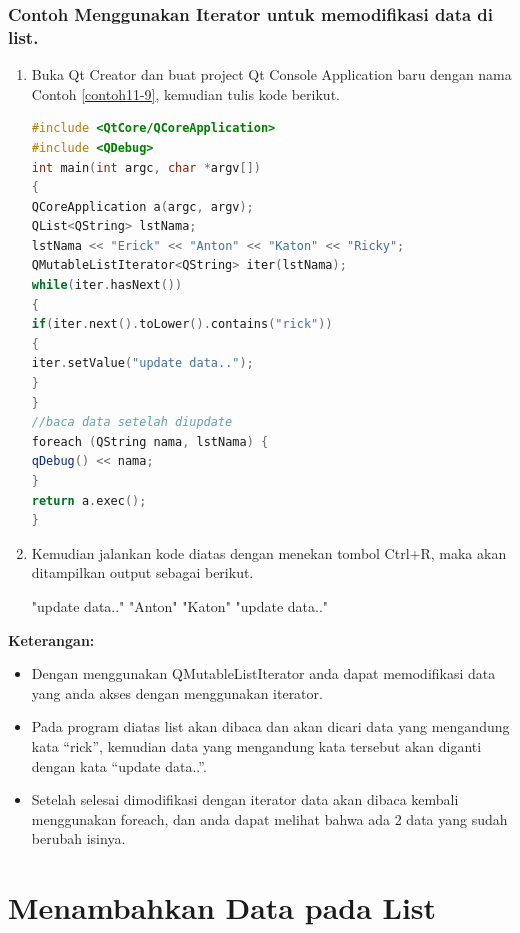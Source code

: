 \subsubsection*{Contoh  Menggunakan Iterator untuk memodifikasi data di list.}

\begin{enumerate}

\item
  Buka Qt Creator dan buat project Qt Console Application baru dengan
  nama Contoh \ref{contoh11-9}, kemudian tulis kode berikut.

\begin{lstlisting}[language=c++, caption= Menggunakan Iterator untuk memodifikasi data di list, label=contoh11-9]
#include <QtCore/QCoreApplication>
#include <QDebug>
int main(int argc, char *argv[])
{
QCoreApplication a(argc, argv);
QList<QString> lstNama;
lstNama << "Erick" << "Anton" << "Katon" << "Ricky";
QMutableListIterator<QString> iter(lstNama);
while(iter.hasNext())
{
if(iter.next().toLower().contains("rick"))
{
iter.setValue("update data..");
}
}
//baca data setelah diupdate
foreach (QString nama, lstNama) {
qDebug() << nama;
}
return a.exec();
}
\end{lstlisting}
\item
  Kemudian jalankan kode diatas dengan menekan tombol Ctrl+R, maka akan
  ditampilkan output sebagai berikut.

\begin{lcverbatim}
"update data.."
"Anton"
"Katon"
"update data.."
\end{lcverbatim}
\end{enumerate}

\textbf{Keterangan:}

\begin{itemize}

\item
  Dengan menggunakan QMutableListIterator anda dapat memodifikasi data
  yang anda akses dengan menggunakan iterator.
\item
  Pada program diatas list akan dibaca dan akan dicari data yang
  mengandung kata ``rick'', kemudian data yang mengandung kata tersebut
  akan diganti dengan kata ``update data..''.
\item
  Setelah selesai dimodifikasi dengan iterator data akan dibaca kembali
  menggunakan foreach, dan anda dapat melihat bahwa ada 2 data yang
  sudah berubah isinya.
\end{itemize}

\section{Menambahkan Data pada
List}\label{menambahkan-data-pada-list}

